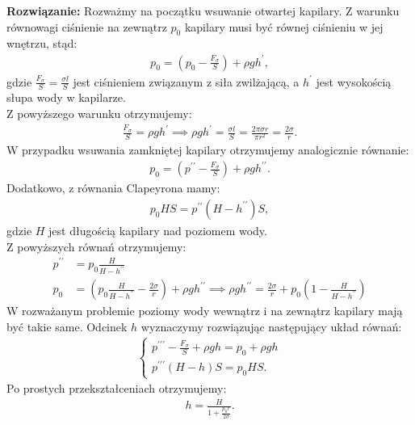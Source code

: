 \documentclass[11pt,a4paper]{article}
\begin{document}
\vspace{0.2cm}
\textbf{Rozwiązanie:} 
Rozważmy na początku wsuwanie otwartej kapilary. Z warunku równowagi ciśnienie na zewnątrz $p_0$ kapilary musi być równej ciśnieniu w jej wnętrzu, stąd:
\begin{align}
p_0 = \left( p_0 - \frac{F_\sigma}{S} \right) + \rho g h^{\prime},
\end{align}
gdzie $\frac{F_ \sigma}{S} = \frac{\sigma l}{S} $ jest ciśnieniem związanym z siła zwilżającą, a $h^{\prime}$ jest wysokością słupa wody w kapilarze.\\
Z powyższego warunku otrzymujemy:
\begin{align}
\frac{F_{\sigma}}{S} =  \rho g h^{\prime} \implies \rho g h^{\prime} = \frac{\sigma l}{S} = \frac{2 \pi\sigma r }{\pi r^2} = \frac{2 \sigma}{r}.
\end{align}
W przypadku wsuwania zamkniętej kapilary otrzymujemy analogicznie równanie:
\begin{align}
p_0 = \left( p^{\prime \prime} - \frac{F_{\sigma}}{S}\right) + \rho g h^{\prime \prime}.
\end{align}
Dodatkowo, z równania Clapeyrona mamy:
\begin{align}
p_0  H S = p^{\prime \prime} (H- h^{\prime \prime}) S,
\end{align}
gdzie $H$ jest długością kapilary nad poziomem wody.\\
Z powyższych równań otrzymujemy:
\begin{align}
p^{\prime \prime} &= p_0 \frac{H}{H-h^{\prime\prime}}\\
p_0 &= \left(p_0 \frac{H}{H-h^{\prime\prime}} - \frac{2 \sigma}{r} \right) + \rho g h^{\prime \prime} \implies 
\rho g h^{\prime \prime} =  \frac{2 \sigma}{r} + p_0 \left(1 - \frac{H}{H-h^{\prime \prime}} \right) 
\end{align}
W rozważanym problemie poziomy wody wewnątrz i na zewnątrz kapilary mają być takie same. Odcinek $h$ wyznaczymy rozwiązując następujący układ równań:
\begin{align}
\begin{cases}
p^{\prime \prime \prime}- \frac{F_{\sigma}}{S} + \rho g h =  p_0 + \rho g h \\
p^{\prime \prime \prime}(H-h) S = p_0 H S.
\end{cases}
\end{align} 
Po prostych przekształceniach otrzymujemy:
\begin{align}
h = \frac{H}{1 + \frac{p_0 r}{2 \sigma}}.
\end{align}
\end{document}
